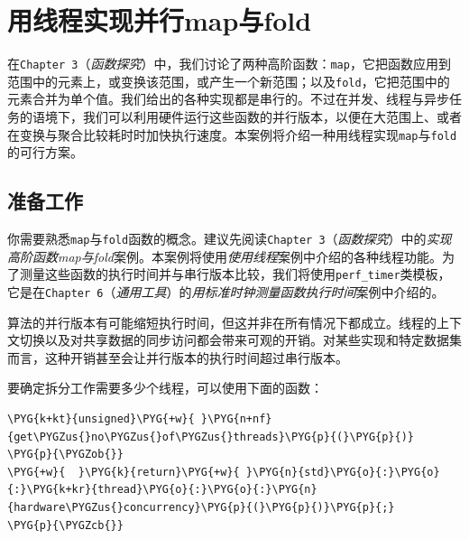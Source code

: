 
\section{用线程实现并行map与fold}



在\texttt{Chapter 3}（\textit{函数探究}）中，我们讨论了两种高阶函数：\texttt{map}，它把函数应用到范围中的元素上，或变换该范围，或产生一个新范围；以及\texttt{fold}，它把范围中的元素合并为单个值。我们给出的各种实现都是串行的。不过在并发、线程与异步任务的语境下，我们可以利用硬件运行这些函数的并行版本，以便在大范围上、或者在变换与聚合比较耗时时加快执行速度。本案例将介绍一种用线程实现\texttt{map}与\texttt{fold}的可行方案。



\subsection{准备工作}



你需要熟悉\texttt{map}与\texttt{fold}函数的概念。建议先阅读\texttt{Chapter 3}（\textit{函数探究}）中的\textit{实现高阶函数map与fold}案例。本案例将使用\textit{使用线程}案例中介绍的各种线程功能。为了测量这些函数的执行时间并与串行版本比较，我们将使用\texttt{perf\_\allowbreak{}timer}类模板，它是在\texttt{Chapter 6}（\textit{通用工具}）的\textit{用标准时钟测量函数执行时间}案例中介绍的。



\begin{myNote}
算法的并行版本有可能缩短执行时间，但这并非在所有情况下都成立。线程的上下文切换以及对共享数据的同步访问都会带来可观的开销。对某些实现和特定数据集而言，这种开销甚至会让并行版本的执行时间超过串行版本。
\end{myNote}



要确定拆分工作需要多少个线程，可以使用下面的函数：



\begin{codeblockbg}
\begin{Verbatim}[commandchars=\\\{\},breaklines=true,breakanywhere=true,fontsize=\codefont,xleftmargin=17bp]
\PYG{k+kt}{unsigned}\PYG{+w}{ }\PYG{n+nf}{get\PYGZus{}no\PYGZus{}of\PYGZus{}threads}\PYG{p}{(}\PYG{p}{)}
\PYG{p}{\PYGZob{}}
\PYG{+w}{  }\PYG{k}{return}\PYG{+w}{ }\PYG{n}{std}\PYG{o}{:}\PYG{o}{:}\PYG{k+kr}{thread}\PYG{o}{:}\PYG{o}{:}\PYG{n}{hardware\PYGZus{}concurrency}\PYG{p}{(}\PYG{p}{)}\PYG{p}{;}
\PYG{p}{\PYGZcb{}}
\end{Verbatim}
\end{codeblockbg}


